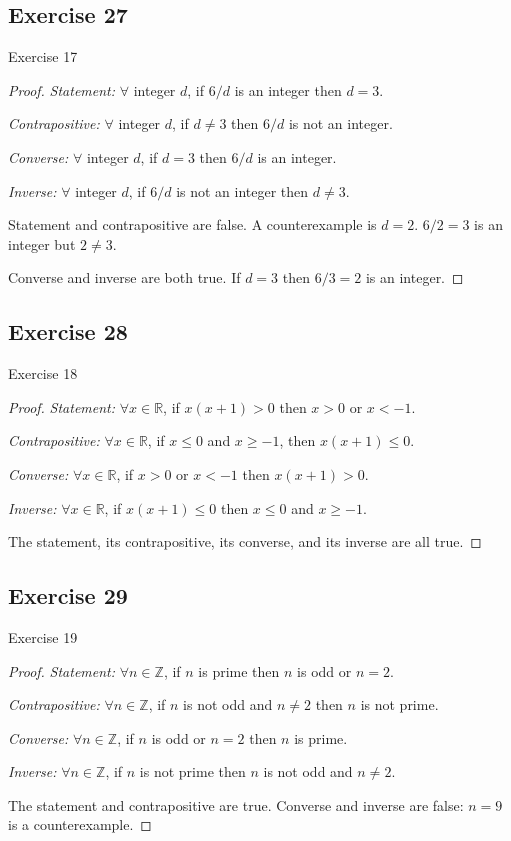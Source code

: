 \documentclass[14pt]{extarticle}
\newcommand{\R}{\mathbb{R}}
\newcommand{\Z}{\mathbb{Z}}
\newcommand{\fa}{\forall}
\begin{document}
\subsection{Exercise 27}
Exercise 17

\begin{proof}
{\it Statement:} $\fa$ integer $d$, if $6 / d$ is an integer then $d = 3$.

{\it Contrapositive:} $\fa$ integer $d$, if $d \neq 3$ then $6 / d$ is not an integer.

{\it Converse:} $\fa$ integer $d$, if $d = 3$ then $6 / d$ is an integer.

{\it Inverse:} $\fa$ integer $d$, if $6 / d$ is not an integer then $d \neq 3$.

Statement and contrapositive are false. A counterexample is $d = 2$. $6 / 2 = 3$ is an integer but $2 \neq 3$.

Converse and inverse are both true. If $d = 3$ then $6 / 3 = 2$ is an integer.
\end{proof}

\subsection{Exercise 28}
Exercise 18

\begin{proof}
{\it Statement:} $\fa x \in \R$, if $x(x + 1) > 0$ then $x > 0$ or $x < -1$.

{\it Contrapositive:} $\fa x \in \R$, if $x \leq 0$ and $x \geq -1$, then $x(x + 1) \leq 0$.

{\it Converse:} $\fa x \in \R$, if $x > 0$ or $x < -1$ then $x(x + 1) > 0$.

{\it Inverse:} $\fa x \in \R$, if $x(x + 1) \leq 0$ then $x \leq 0$ and $x \geq -1$.

The statement, its contrapositive, its converse, and its
inverse are all true.
\end{proof}

\subsection{Exercise 29}
Exercise 19

\begin{proof}
{\it Statement:} $\fa n \in \Z$, if $n$ is prime then $n$ is odd or $n = 2$.

{\it Contrapositive:} $\fa n \in \Z$, if $n$ is not odd and $n \neq 2$ then $n$ is not prime.

{\it Converse:} $\fa n \in \Z$, if $n$ is odd or $n = 2$ then $n$ is prime.

{\it Inverse:} $\fa n \in \Z$, if $n$ is not prime then $n$ is not odd and $n \neq 2$.

The statement and contrapositive are true. Converse and inverse are false: $n = 9$ is a counterexample.
\end{proof}
\end{document}
